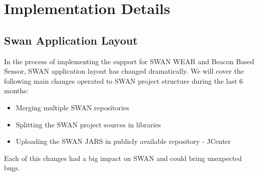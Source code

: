 
\chapter{Implementation Details} %

\label{Chapter5} %



\section{Swan Application Layout}
In the process of implementing the support for SWAN WEAR and Beacon Based Sensor, SWAN application layout has changed dramatically.
We will cover the following main changes operated to SWAN project structure during the last 6 months:
\begin{itemize}
 \item Merging multiple SWAN repositories
 \item Splitting the SWAN project sources in libraries
 \item Uploading the SWAN JARS in publicly available repository - JCenter
\end{itemize}

Each of this changes had a big impact on SWAN and could bring unexpected bugs.


